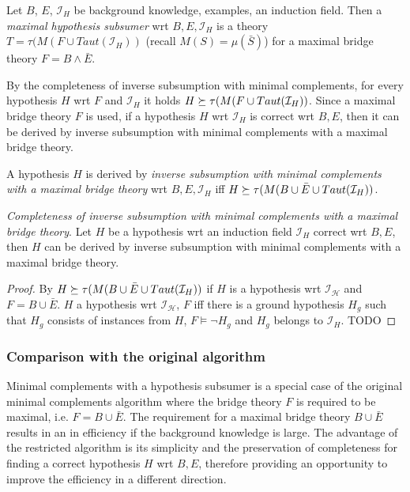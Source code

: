 \begin{defn}
Let $B$, $E$, $\mathcal{I}_H$ be background knowledge, examples, an induction field. Then a \emph{maximal hypothesis subsumer} wrt $B, E, \mathcal{I}_H$ is a theory
$T=\tau(M(F \cup Taut(\mathcal{I}_H))$ (recall $M(S)=\mu(\bar{S})$) for a maximal bridge theory $F=B \land \bar{E}$.
\end{defn}

By the completeness of inverse subsumption with minimal complements, for every hypothesis $H$ wrt $F$ and $\mathcal{I}_H$ it holds $H \succeq \tau(M(F \cup Taut(\mathcal{I}_H))$. Since a maximal bridge theory $F$ is used, if a hypothesis $H$ wrt $\mathcal{I}_H$ is correct wrt $B, E$, then it can be derived by inverse subsumption with minimal complements with a maximal bridge theory.

\begin{defn}
A hypothesis $H$ is derived by \emph{inverse subsumption with minimal complements with a maximal bridge theory} wrt $B, E, \mathcal{I}_H$ iff
$H \succeq \tau(M(B \cup \bar{E} \cup Taut(\mathcal{I}_H))$.
\end{defn}

\begin{proposition}\emph{Completeness of inverse subsumption with minimal complements with a maximal bridge theory}.
Let $H$ be a hypothesis wrt an induction field $\mathcal{I}_H$ correct wrt $B, E$, then $H$ can be derived by inverse subsumption with minimal complements with a maximal bridge theory.
\end{proposition}

\begin{proof}
By  $H \succeq \tau(M(B \cup \bar{E} \cup Taut(\mathcal{I}_H))$ if $H$ is a hypothesis wrt $\mathcal{I_H}$ and $F=B \cup \bar{E}$. $H$ a hypothesis wrt $\mathcal{I_H}$, $F$ iff there is a ground hypothesis $H_g$ such that $H_g$ consists of instances from $H$,
$F \models \neg H_g$ and $H_g$ belongs to $\mathcal{I}_H$. TODO
\end{proof}

\subsubsection{Comparison with the original algorithm}
Minimal complements with a hypothesis subsumer is a special case of the original minimal complements algorithm where the bridge theory $F$ is required to be maximal, i.e. $F=B \cup \bar{E}$. The requirement for a maximal bridge theory $B \cup \bar{E}$ results in an in efficiency if the background knowledge is large. The advantage of the restricted algorithm is its simplicity and the preservation of completeness for finding a correct hypothesis $H$ wrt $B, E$, therefore providing an opportunity to improve the efficiency in a different direction.

